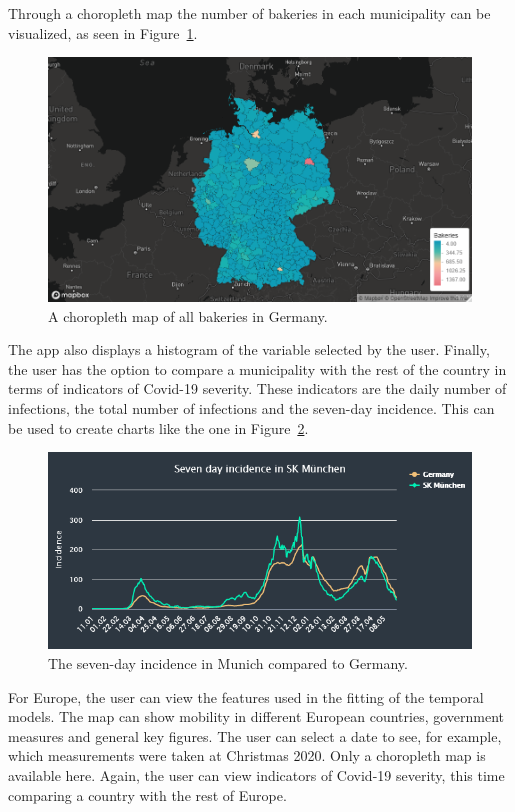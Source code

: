 Through a choropleth map the number of bakeries in each municipality can be visualized, as seen in Figure~\ref{fig:map_3}.
\begin{figure}[H]
    \centering
    \includegraphics[width = \textwidth]{bakeries_germany_choro.png}
    \caption{A choropleth map of all bakeries in Germany.}
    \label{fig:map_3}
\end{figure}
The app also displays a histogram of the variable selected by the user. Finally, the user has the option to compare a municipality with the rest of the country in terms of indicators of Covid-19 severity. These indicators are the daily number of infections, the total number of infections and the seven-day incidence. This can be used to create charts like the one in Figure~\ref{fig:inc_muc}.
\begin{figure}[H]
    \centering
    \includegraphics[width = \textwidth]{inc_muc.png}
    \caption{The seven-day incidence in Munich compared to Germany.}
    \label{fig:inc_muc}
\end{figure}
For Europe, the user can view the features used in the fitting of the temporal models. The map can show mobility in different European countries, government measures and general key figures. The user can select a date to see, for example, which measurements were taken at Christmas 2020. Only a choropleth map is available here. Again, the user can view indicators of Covid-19 severity, this time comparing a country with the rest of Europe.
